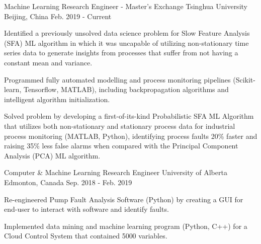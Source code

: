 

\begin{cventries}

  \cventry
    {Machine Learning Research Engineer - Master's Exchange} %
    {Tsinghua University} %
    {Beijing, China} %
    {Feb. 2019 - Current} %
    {
      \begin{cvitems} %
        \item{Identified a previously unsolved data science problem for Slow Feature Analysis (SFA) ML algorithm in which it was uncapable of utilizing non-stationary time series data to generate insights from processes that suffer from not having a constant mean and variance.}
        \item {Programmed fully automated modelling and process monitoring pipelines (Scikit-learn, Tensorflow, MATLAB), including backpropagation algorithms and intelligent algorithm initialization.}
        \item {Solved problem by developing a first-of-its-kind Probabilistic SFA ML Algorithm that utilizes both non-stationary and stationary process data for industrial process monitoring (MATLAB, Python), identifying process faults 20\% faster and raising 35\% less false alarms when compared with the Principal Component Analysis (PCA) ML algorithm.}
      \end{cvitems}
    }

  \cventry
    {Computer \& Machine Learning Research Engineer} %
    {University of Alberta} %
    {Edmonton, Canada} %
    {Sep. 2018 - Feb. 2019} %
    {
      \begin{cvitems} %
        \item {Re-engineered Pump Fault Analysis Software (Python) by creating a GUI for end-user to  interact with software and identify faults.}
        \item {Implemented data mining and machine learning program (Python, C++) for a Cloud Control System that contained 5000 variables.}        
      \end{cvitems}
    }


\end{cventries}
